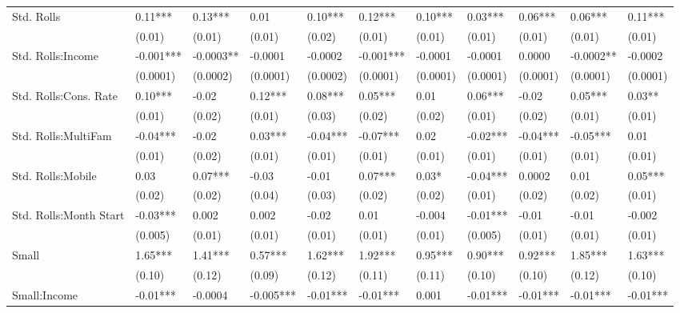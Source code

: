\begin{table}[]
{\begin{tabular}{lllllllllll}
Std. Rolls             & 0.11***  & 0.13***   & 0.01     & 0.10***  & 0.12***  & 0.10***  & 0.03***   & 0.06***     & 0.06***  & 0.11***  \\
                       & (0.01)   & (0.01)    & (0.01)   & (0.02)   & (0.01)   & (0.01)   & (0.01)    & (0.01)      & (0.01)   & (0.01)   \\
Std. Rolls:Income      & -0.001***& -0.0003** & -0.0001  & -0.0002  & -0.001***& -0.0001  & -0.0001   & 0.0000      & -0.0002**& -0.0002  \\
                       & (0.0001) & (0.0002)  & (0.0001) & (0.0002) & (0.0001) & (0.0001) & (0.0001)  & (0.0001)    & (0.0001) & (0.0001) \\
Std. Rolls:Cons. Rate  & 0.10***  & -0.02     & 0.12***  & 0.08***  & 0.05***  & 0.01     & 0.06***   & -0.02       & 0.05***  & 0.03**   \\
                       & (0.01)   & (0.02)    & (0.01)   & (0.03)   & (0.02)   & (0.02)   & (0.01)    & (0.02)      & (0.01)   & (0.01)   \\
Std. Rolls:MultiFam    & -0.04*** & -0.02     & 0.03***  & -0.04*** & -0.07*** & 0.02     & -0.02***  & -0.04***    & -0.05*** & 0.01     \\
                       & (0.01)   & (0.02)    & (0.01)   & (0.01)   & (0.01)   & (0.01)   & (0.01)    & (0.01)      & (0.01)   & (0.01)   \\
Std. Rolls:Mobile      & 0.03     & 0.07***   & -0.03    & -0.01    & 0.07***  & 0.03*    & -0.04***  & 0.0002      & 0.01     & 0.05***  \\
                       & (0.02)   & (0.02)    & (0.04)   & (0.03)   & (0.02)   & (0.02)   & (0.01)    & (0.02)      & (0.02)   & (0.01)   \\
Std. Rolls:Month Start & -0.03*** & 0.002     & 0.002    & -0.02    & 0.01     & -0.004   & -0.01***  & -0.01       & -0.01    & -0.002   \\
                       & (0.005)  & (0.01)    & (0.01)   & (0.01)   & (0.01)   & (0.01)   & (0.005)   & (0.01)      & (0.01)   & (0.01)   \\
Small                  & 1.65***  & 1.41***   & 0.57***  & 1.62***  & 1.92***  & 0.95***  & 0.90***   & 0.92***     & 1.85***  & 1.63***  \\
                       & (0.10)   & (0.12)    & (0.09)   & (0.12)   & (0.11)   & (0.11)   & (0.10)    & (0.10)      & (0.12)   & (0.10)   \\
Small:Income           & -0.01*** & -0.0004   & -0.005***& -0.01*** & -0.01*** & 0.001    & -0.01***  & -0.01***    & -0.01*** & -0.01*** \\

\end{tabular}}
\end{table}
